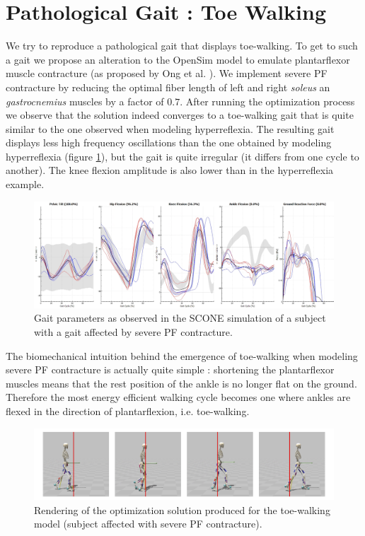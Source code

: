 \documentclass[11pt]{article}
\begin{document}
\section{Pathological Gait : Toe Walking}

We try to reproduce a pathological gait that displays toe-walking. To get to such a gait we propose an alteration to the OpenSim model to emulate plantarflexor muscle contracture (as proposed by Ong et al. \cite{1}). We implement severe PF contracture by reducing the optimal fiber length of left and right \textit{soleus} an \textit{gastrocnemius} muscles by a factor of $0.7$. After running the optimization process we observe that the solution indeed converges to a toe-walking gait that is quite similar to the one observed when modeling hyperreflexia. The resulting gait displays less high frequency oscillations than the one obtained by modeling hyperreflexia (figure \ref{toe_gait}), but the gait is quite irregular (it differs from one cycle to another). The knee flexion amplitude is also lower than in the hyperreflexia example.

\begin{figure}[h!]
    \centering
    \includegraphics[width=\textwidth]{screens/toe_walk_gait.png}
    \caption{Gait parameters as observed in the SCONE simulation of a subject with a gait affected by severe PF contracture.}
    \label{toe_gait}
\end{figure}

The biomechanical intuition behind the emergence of toe-walking when modeling severe PF contracture is actually quite simple : shortening the plantarflexor muscles means that the rest position of the ankle is no longer flat on the ground. Therefore the most energy efficient walking cycle becomes one where ankles are flexed in the direction of plantarflexion, i.e. toe-walking.

\begin{figure}[h!]
    \centering
    \includegraphics[width=\textwidth]{screens/toe_render.jpg}
    \caption{Rendering of the optimization solution produced for the toe-walking model (subject affected with severe PF contracture).}
    \label{toe_render}
\end{figure}
\end{document}
